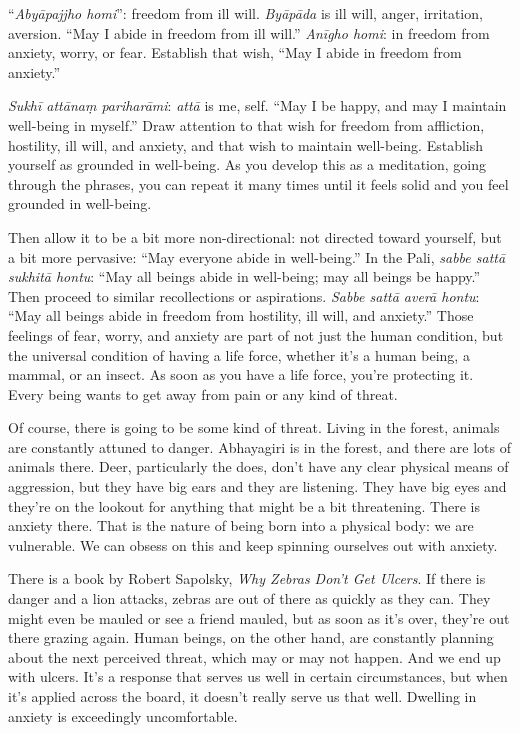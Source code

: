 “\emph{Abyāpajjho homi}”: freedom from ill will. \emph{Byāpāda} is ill
will, anger, irritation, aversion. “May I abide in freedom from ill
will.” \emph{Anīgho homi}: in freedom from anxiety, worry, or fear.
Establish that wish, “May I abide in freedom from anxiety.”

\emph{Sukhī attānaṃ pariharāmi}: \emph{attā} is me, self. “May I be
happy, and may I maintain well-being in myself.” Draw attention to that
wish for freedom from affliction, hostility, ill will, and anxiety, and
that wish to maintain well-being. Establish yourself as grounded in
well-being. As you develop this as a meditation, going through the
phrases, you can repeat it many times until it feels solid and you feel
grounded in well-being.

Then allow it to be a bit more non-directional: not directed toward
yourself, but a bit more pervasive: “May everyone abide in well-being.”
In the Pali, \emph{sabbe sattā sukhitā hontu}: “May all beings abide in
well-being; may all beings be happy.” Then proceed to similar
recollections or aspirations. \emph{Sabbe sattā averā hontu}: “May all
beings abide in freedom from hostility, ill will, and anxiety.” Those
feelings of fear, worry, and anxiety are part of not just the human
condition, but the universal condition of having a life force, whether
it’s a human being, a mammal, or an insect. As soon as you have a life
force, you’re protecting it. Every being wants to get away from pain or
any kind of threat.

Of course, there is going to be some kind of threat. Living in the
forest, animals are constantly attuned to danger. Abhayagiri is in the
forest, and there are lots of animals there. Deer, particularly the
does, don’t have any clear physical means of aggression, but they have
big ears and they are listening. They have big eyes and they’re on the
lookout for anything that might be a bit threatening. There is anxiety
there. That is the nature of being born into a physical body: we are
vulnerable. We can obsess on this and keep spinning ourselves out with
anxiety.

There is a book by Robert Sapolsky, \emph{Why Zebras Don’t Get Ulcers}.
If there is danger and a lion attacks, zebras are out of there as
quickly as they can. They might even be mauled or see a friend mauled,
but as soon as it’s over, they’re out there grazing again. Human beings,
on the other hand, are constantly planning about the next perceived
threat, which may or may not happen. And we end up with ulcers. It’s a
response that serves us well in certain circumstances, but when it’s
applied across the board, it doesn’t really serve us that well. Dwelling
in anxiety is exceedingly uncomfortable.

